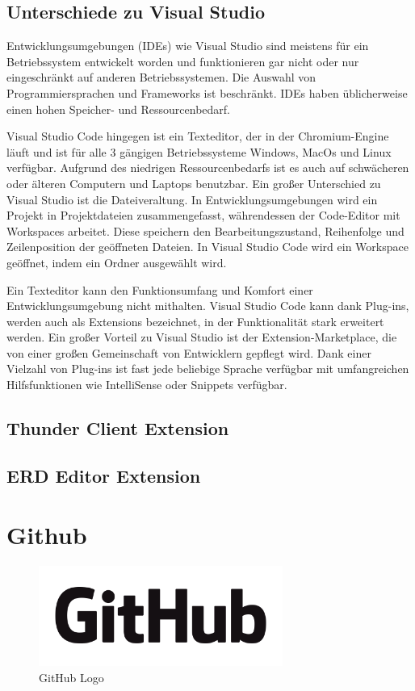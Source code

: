 \subsection{Unterschiede zu Visual Studio}
Entwicklungsumgebungen (IDEs) wie Visual Studio sind meistens für ein Betriebssystem entwickelt worden und funktionieren 
gar nicht oder nur eingeschränkt auf anderen Betriebssystemen. Die Auswahl von Programmiersprachen und Frameworks ist beschränkt. IDEs 
haben üblicherweise einen hohen Speicher- und Ressourcenbedarf.

Visual Studio Code hingegen ist ein Texteditor, der in der Chromium-Engine läuft und ist für alle 3 gängigen Betriebssysteme 
Windows, MacOs und Linux verfügbar. Aufgrund des niedrigen Ressourcenbedarfs ist es auch auf schwächeren oder älteren Computern und Laptops benutzbar.
Ein großer Unterschied zu Visual Studio ist die Dateiveraltung. 
In Entwicklungsumgebungen wird ein Projekt in Projektdateien zusammengefasst, 
währendessen der Code-Editor mit Workspaces arbeitet. Diese speichern den 
Bearbeitungszustand, Reihenfolge und Zeilenposition der geöffneten Dateien. 
In Visual Studio Code wird ein Workspace geöffnet, indem ein Ordner ausgewählt wird.

Ein Texteditor kann den Funktionsumfang und Komfort einer Entwicklungsumgebung nicht mithalten. Visual Studio Code 
kann dank Plug-ins, werden auch als Extensions bezeichnet, in der Funktionalität stark erweitert werden.
Ein großer Vorteil zu Visual Studio ist der Extension-Marketplace, die von einer großen Gemeinschaft von Entwicklern gepflegt wird.
Dank einer Vielzahl von Plug-ins ist fast jede beliebige Sprache verfügbar mit umfangreichen Hilfsfunktionen wie IntelliSense oder Snippets verfügbar.

\subsection{Thunder Client Extension}
\author{Stefano Pyringer}


\subsection{ERD Editor Extension}
\author{Stefano Pyringer}

\section{Github}
\author{Mirzet Sakonjic}
\cite{GitHub}
\begin{figure}[h]
    \begin{center}
        \includegraphics*[width=8cm]{pics/GitHub_Logo.png}
        \caption[GitHub Logo]{GitHub Logo \cite{GithubLogo}}
    \end{center}
\end{figure}
